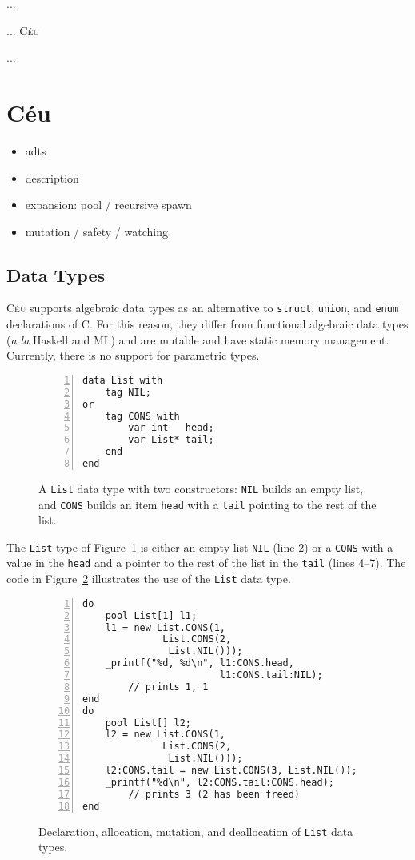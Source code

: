 \documentclass{acm_proc_article-sp}
\newcommand{\CEU}{\textsc{C\'{e}u}\xspace}
\newcommand{\code}[1] {{\small{\texttt{#1}}}}
\begin{document}
...

... \CEU~\cite{ceu.sensys13,ceu.mod15}

...

\section{C\'eu}

\begin{itemize}
\item adts
\item description
\item expansion: pool / recursive spawn
\item mutation / safety / watching
\end{itemize}

\subsection{Data Types}

\CEU supports algebraic data types as an alternative to \code{struct}, 
\code{union}, and \code{enum} declarations of C.
For this reason, they differ from functional algebraic data types (\emph{a la} 
Haskell and ML) and are mutable and have static memory management.
Currently, there is no support for parametric types.

\begin{figure}[t]
\begin{lstlisting}[numbers=left,xleftmargin=3em]
data List with
    tag NIL;
or
    tag CONS with
        var int   head;
        var List* tail;
    end
end
\end{lstlisting}
\caption{
A \code{List} data type with two constructors:
    \code{NIL} builds an empty list, and
    \code{CONS} builds an item \code{head} with a \code{tail} pointing to the 
rest of the list.
\label{lst.data.list}
}
\end{figure}

The \code{List} type of Figure~\ref{lst.data.list} is either an empty list 
\code{NIL} (line 2) or a \code{CONS} with a value in the \code{head} and a 
pointer to the rest of the list in the \code{tail} (lines 4--7).
The code in Figure~\ref{lst.data.mut} illustrates the use of the \code{List} 
data type.

\begin{figure}[t]
\begin{lstlisting}[numbers=left,xleftmargin=3em]
do
    pool List[1] l1;
    l1 = new List.CONS(1,
              List.CONS(2,
               List.NIL()));
    _printf("%d, %d\n", l1:CONS.head,
                        l1:CONS.tail:NIL);
        // prints 1, 1
end
do
    pool List[] l2;
    l2 = new List.CONS(1,
              List.CONS(2,
               List.NIL()));
    l2:CONS.tail = new List.CONS(3, List.NIL());
    _printf("%d\n", l2:CONS.tail:CONS.head);
        // prints 3 (2 has been freed)
end
\end{lstlisting}
\caption{
Declaration, allocation, mutation, and deallocation of \code{List} data types.
\label{lst.data.mut}
}
\end{figure}
\end{document}
